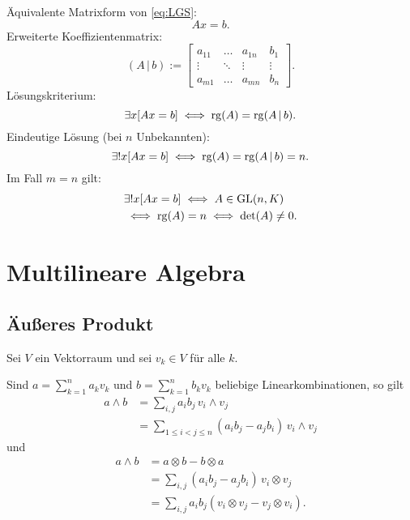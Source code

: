Äquivalente Matrixform von \eqref{eq:LGS}:
\begin{equation}
Ax=b.
\end{equation}
Erweiterte Koeffizientenmatrix:
\begin{equation}
(A\,|\,b) := \left[\begin{array}{ccc|c}
a_{11} & \ldots & a_{1n} & b_1\\
\vdots & \ddots & \vdots & \vdots\\
a_{m1} & \ldots & a_{mn} & b_n
\end{array}\right].
\end{equation}
Lösungskriterium:
\begin{equation}
\exists x[Ax=b] \iff \operatorname*{rg}(A)=\operatorname*{rg}(A\,|\,b).
\end{equation}
Eindeutige Lösung (bei $n$ Unbekannten):
\begin{equation}
\exists! x[Ax=b] \iff\operatorname*{rg}(A)=\operatorname*{rg}(A\,|\,b)=n.
\end{equation}
Im Fall $m=n$ gilt:
\begin{equation}
\begin{split}
&\exists! x[Ax=b] \iff A\in\operatorname{GL}(n,K)\\
&\iff \operatorname*{rg}(A)=n \iff \det(A)\ne 0.
\end{split}
\end{equation}

\newpage
\section{Multilineare Algebra}
\subsection{Äußeres Produkt}
Sei $V$ ein Vektorraum und sei $v_k\in V$ für alle $k$.

Sind $a=\sum_{k=1}^n a_k v_k$
und $b=\sum_{k=1}^n b_k v_k$ beliebige
Linearkombinationen, so gilt
\begin{equation}
\begin{split}
a\wedge b &= \sum_{i,j} a_i b_j\,v_i\wedge v_j\\
&= \sum_{1\le i<j\le n} (a_i b_j-a_j b_i)\,v_i\wedge v_j
\end{split}
\end{equation}
und
\begin{equation}
\begin{split}
a\wedge b &= a\otimes b-b\otimes a\\
&= \sum_{i,j} (a_i b_j-a_j b_i)\,v_i\otimes v_j\\
&= \sum_{i,j} a_i b_j (v_i\otimes v_j-v_j\otimes v_i).
\end{split}
\end{equation}
